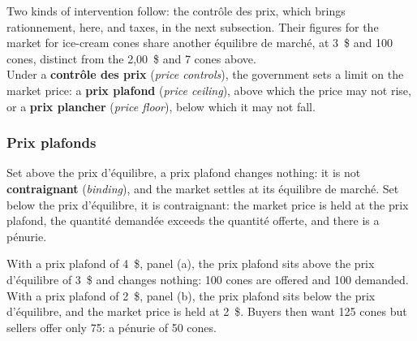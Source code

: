 Two kinds of intervention follow: the contrôle des prix, which brings rationnement,
here, and taxes, in the next subsection. Their figures for the market for ice-cream
cones share another équilibre de marché, at 3~\$ and 100 cones, distinct from the
2,00~\$ and 7 cones above.\\

Under a \textbf{contrôle des prix} (\textit{price controls}), the government sets a
limit on the market price: a \textbf{prix plafond} (\textit{price ceiling}), above
which the price may not rise, or a \textbf{prix plancher} (\textit{price floor}),
below which it may not fall.

\subsubsection{Prix plafonds}

Set above the prix d'équilibre, a prix plafond changes nothing: it is not
\textbf{contraignant} (\textit{binding}), and the market settles at its équilibre de
marché. Set below the prix d'équilibre, it is contraignant: the market price is
held at the prix plafond, the quantité demandée exceeds the quantité offerte, and
there is a pénurie.

\begin{example}
  With a prix plafond of 4~\$, panel (a), the prix plafond sits above the prix
  d'équilibre of 3~\$ and changes nothing: 100 cones are offered and 100 demanded.
  With a prix plafond of 2~\$, panel (b), the prix plafond sits below the prix
  d'équilibre, and the market price is held at 2~\$. Buyers then want 125 cones but
  sellers offer only 75: a pénurie of 50 cones.
\end{example}

